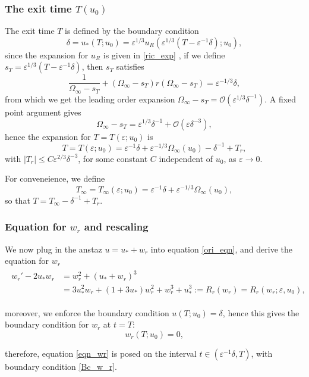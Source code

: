 \documentclass[letterpaper,11pt]{article}
\newcommand{\rmO}{\mathcal{O}}
\newcommand{\eps}{\varepsilon}
\numberwithin{equation}{section}
\theoremstyle{plain}
\begin{document}
\subsubsection{The exit time \texorpdfstring{$T(u_0)$}{T(u_0)}}\label{exit_time}
The exit time $T$ is defined by the boundary condition 
\[
\delta = u_*(T; u_0) = \eps^{1/3}u_R(\eps^{1/3}(T-\eps^{-1}\delta); u_0),
\]
since the expansion for $u_R$ is given in \eqref{ric_exp} , if we define $s_T = \eps^{1/3}(T-\eps^{-1}\delta)$, then $s_T$ satisfies
\[
\frac{1}{\Omega_\infty-s_T} + (\Omega_\infty-s_T)r(\Omega_\infty-s_T) = \eps^{-1/3}\delta,
\]
from which we get the leading order expansion $\Omega_\infty-s_T = \rmO(\eps^{1/3}\delta^{-1})$. A fixed point argument gives
\[
\Omega_\infty - s_T = \eps^{1/3}\delta^{-1} + \rmO(\eps \delta^{-3}),
\]
hence the expansion for $T=T(\eps; u_0)$ is
\begin{equation}\label{T_exp}
T = T(\eps;u_0) = \eps^{-1}\delta + \eps^{-1/3}\Omega_\infty(u_0) - \delta^{-1} + T_r,
\end{equation}
with 
$|T_r|\le C\eps^{2/3}\delta^{-3}$, for some constant $C$ independent of $u_0$, as $\eps \to 0$.

For conveneience, we define \[
T_\infty = T_\infty(\eps; u_0)= \eps^{-1}\delta + \eps^{-1/3}\Omega_\infty(u_0),
\]
so that $T = T_\infty - \delta^{-1} + T_r$.

\subsubsection{Equation for \texorpdfstring{$w_r$}{wr} and rescaling}\label{equation_wr}
We now plug in the anstaz $u = u_* + w_r$ into equation \eqref{ori_eqn}, and derive the equation for $w_r$
\begin{align}\label{eqn_wr}
\begin{split}
w_r' - 2u_*w_r &= w_r^2 + (u_*+w_r)^3 \\
&= 3u_*^2w_r+(1+3u_*)w_r^2 +w_r^3 +u_*^3 := R_r(w_r)=R_r(w_r; \eps,u_0),
\end{split}
\end{align}

moreover, we enforce the boundary condition $u(T; u_0) = \delta$, hence this gives the boundary condition for $w_r$ at $t=T$:
\begin{equation}\label{Bc_w_r}
w_r(T;u_0) = 0,
\end{equation}


therefore, equation \eqref{eqn_wr} is posed on the interval $t \in (\eps^{-1}\delta, T)$, with boundary condition \eqref{Bc_w_r}.
\end{document}
